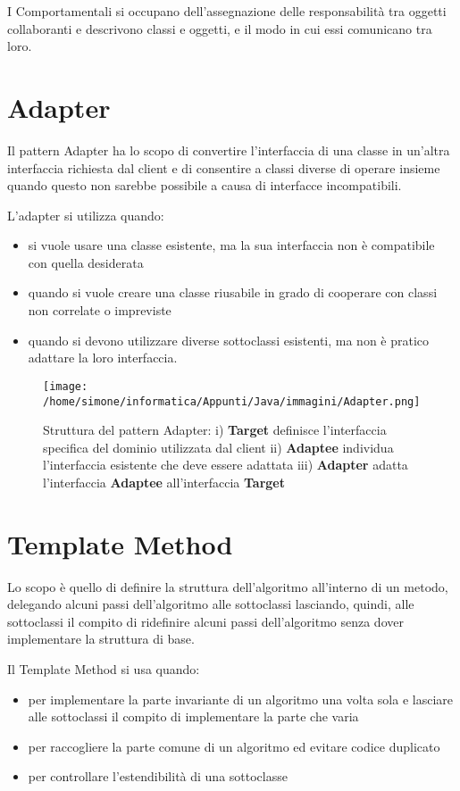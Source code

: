\documentclass[a4paper,12pt,twoside]{book}
\begin{document}
I Comportamentali si occupano dell'assegnazione delle responsabilità
tra oggetti collaboranti e descrivono classi e oggetti, e il modo in
cui essi comunicano tra loro.

\section{Adapter}


Il pattern Adapter ha lo scopo di convertire l'interfaccia di una
classe in un'altra interfaccia richiesta dal client e di consentire a
classi diverse di operare insieme quando questo non sarebbe possibile
a causa di interfacce incompatibili.

L'adapter si utilizza quando:
\begin{itemize}
\item si vuole usare una classe esistente, ma
  la sua interfaccia non è compatibile con quella desiderata
\item quando si vuole creare una classe riusabile in grado di
  cooperare con classi non correlate o impreviste
\item quando si devono utilizzare diverse sottoclassi esistenti, ma
  non è pratico adattare la loro interfaccia.
\end{itemize}

\begin{figure}
  \centering
  \texttt{[image: /home/simone/informatica/Appunti/Java/immagini/Adapter.png]}
  \caption{Struttura del pattern Adapter: i) \textbf{Target} definisce
    l'interfaccia specifica del dominio utilizzata dal client ii)
    \textbf{Adaptee} individua l'interfaccia esistente che deve essere
    adattata iii) \textbf{Adapter} adatta l'interfaccia \textbf{Adaptee}
    all'interfaccia \textbf{Target}}
\end{figure}


\section{Template Method}

Lo scopo è quello di definire la struttura dell'algoritmo all'interno
di un metodo, delegando alcuni passi dell'algoritmo alle sottoclassi
lasciando, quindi, alle sottoclassi il compito di ridefinire alcuni
passi dell'algoritmo senza dover implementare la struttura di base.

Il Template Method si usa quando:
\begin{itemize}
\item per implementare la parte invariante di un algoritmo una volta sola e
  lasciare alle sottoclassi il compito di implementare la parte che
  varia
\item per raccogliere la parte comune di un algoritmo ed evitare
  codice duplicato
\item per controllare l'estendibilità di una sottoclasse
\end{itemize}
\end{document}
